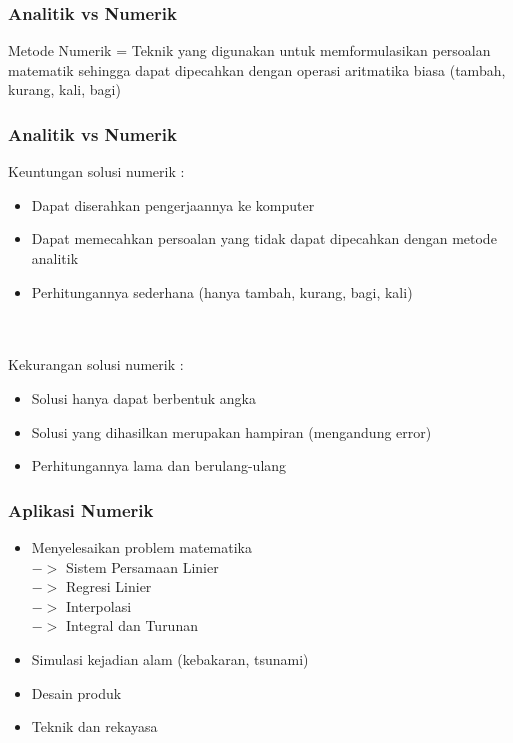 \documentclass{beamer}
\begin{document}

\begin{frame}
\frametitle{Analitik vs Numerik}
Metode Numerik = Teknik yang digunakan untuk memformulasikan persoalan matematik sehingga dapat dipecahkan  dengan operasi aritmatika biasa (tambah, kurang, kali, bagi)
\end{frame}


\begin{frame}
\frametitle{Analitik vs Numerik}
Keuntungan solusi numerik :
\begin{itemize}
\item Dapat diserahkan pengerjaannya ke komputer
\item Dapat memecahkan persoalan yang tidak dapat dipecahkan dengan metode analitik
\item Perhitungannya sederhana (hanya tambah, kurang, bagi, kali)
\end{itemize}
\ \\\ \\
Kekurangan solusi numerik :
\begin{itemize}
\item Solusi hanya dapat berbentuk angka
\item Solusi yang dihasilkan merupakan hampiran (mengandung error)
\item Perhitungannya lama dan berulang-ulang
\end{itemize}

\end{frame}


\begin{frame}
\frametitle{Aplikasi Numerik}
\begin{itemize}
\item Menyelesaikan problem matematika
\\\quad $->$ Sistem Persamaan Linier 
\\\quad $->$ Regresi Linier
\\\quad $->$ Interpolasi
\\\quad $->$ Integral dan Turunan
\item Simulasi kejadian alam (kebakaran, tsunami)
\item Desain produk 
\item Teknik dan rekayasa
\end{itemize}

\end{frame}
\end{document}

